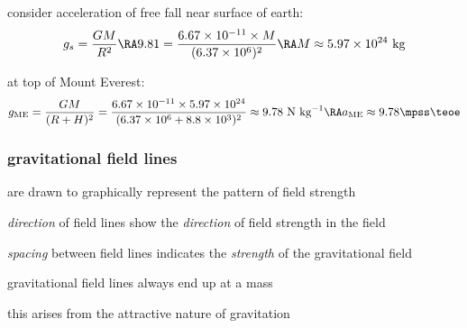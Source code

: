 \sol consider acceleration of free fall near surface of earth:
\begin{equation*}
	g_s = \frac{GM}{R^2} \RA 9.81 = \frac{6.67\times10^{-11}\times M}{(6.37\times10^6)^2} \RA M \approx 5.97\times10^{24} \text{ kg}
\end{equation*}

at top of Mount Everest:
\begin{equation*}
g_\text{ME} = \frac{GM}{(R+H)^2} = \frac{6.67\times10^{-11}\times 5.97\times10^{24}}{(6.37\times10^6+8.8\times10^3)^2} \approx 9.78 \text{ N kg}^{-1} \RA a_\text{ME} \approx 9.78 \mpss \teoe
\end{equation*}



\subsubsection{gravitational field lines}
 are drawn to graphically represent the pattern of field strength

\cmt \emph{direction} of field lines show the \emph{direction} of field strength in the field
	
\cmt \emph{spacing} between field lines indicates the \emph{strength} of the gravitational field
	
\cmt gravitational field lines always end up at a mass

     this arises from the attractive nature of gravitation

